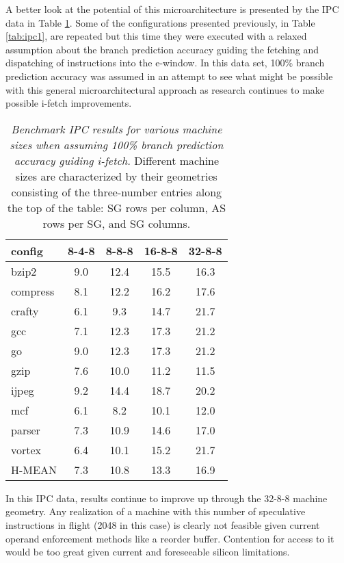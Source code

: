\documentclass[10pt,dvips]{article}
\begin{document}
A better look at the potential of this microarchitecture is
presented by the IPC data in Table \ref{tab:ipc2}.
Some of the configurations presented previously, 
in Table \ref{tab:ipc1},
are repeated but this time they were executed with a relaxed
assumption about the branch prediction accuracy guiding the
fetching and dispatching of instructions into the e-window.
In this data set, 100\% branch prediction accuracy was
assumed in an attempt to see what might be possible with this
general microarchitectural approach as research continues to
make possible i-fetch improvements.
%
\begin{table}
\begin{center}
\caption{{\em Benchmark IPC results for various machine sizes
when assuming 100\% branch prediction accuracy guiding i-fetch.}
Different machine sizes are characterized by their
geometries consisting of the three-number entries along the
top of the table: SG rows per column, AS rows per SG, and
SG columns.}
\label{tab:ipc2}
\vspace{+0.1in}
\begin{tabular}{|l|c|c|c|c|}
\hline 
config&
8-4-8&8-8-8&16-8-8&32-8-8\\
\hline
\hline 
bzip2&9.0&12.4&15.5&16.3\\
\hline 
compress&8.1&12.2&16.2&17.6\\
\hline 
crafty&6.1&9.3&14.7&21.7\\
\hline 
gcc&7.1&12.3&17.3&21.2\\
\hline 
go&9.0&12.3&17.3&21.2\\
\hline 
gzip&7.6&10.0&11.2&11.5\\
\hline 
ijpeg&9.2&14.4&18.7&20.2\\
\hline 
mcf&6.1&8.2&10.1&12.0\\
\hline 
parser&7.3&10.9&14.6&17.0\\
\hline 
vortex&6.4&10.1&15.2&21.7\\
\hline 
\hline 
H-MEAN&7.3&10.8&13.3&16.9\\
\hline
\end{tabular}
\end{center}
\end{table}
%
In this IPC data, results continue to improve up through the
32-8-8 machine geometry.
Any realization of a machine with this number of speculative
instructions in flight (2048 in this case) is clearly not
feasible given current operand enforcement methods like
a reorder buffer.  Contention for access to it would be too great
given current and foreseeable silicon limitations.
%
%
\end{document}
